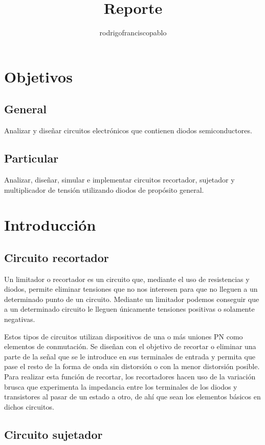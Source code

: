 \documentclass{mylib/reporteConCalif}
\title{Reporte}
\author{rodrigofranciscopablo }
\begin{document}
\coverPage

\section{Objetivos}

\subsection{General}

Analizar y diseñar circuitos electrónicos que contienen diodos semiconductores.

\subsection{Particular}

Analizar, diseñar, simular e implementar circuitos recortador, sujetador y multiplicador de tensión utilizando diodos
de propósito general.

\section{Introducción}

\subsection{Circuito recortador}

Un limitador o recortador es un circuito que, mediante el uso de resistencias y diodos, permite eliminar tensiones que no nos interesen para que no lleguen a un determinado punto de un circuito. Mediante un limitador podemos conseguir que a un determinado circuito le lleguen únicamente tensiones positivas o solamente negativas.

Estos tipos de circuitos utilizan dispositivos de una o más uniones PN como elementos de conmutación. Se diseñan con el objetivo de recortar o eliminar una parte de la señal que se le introduce en sus terminales de entrada y permita que pase el resto de la forma de onda sin distorsión o con la menor distorsión posible. Para realizar esta función de recortar, los recortadores hacen uso de la variación brusca que experimenta la impedancia entre los terminales de los diodos y transistores al pasar de un estado a otro, de ahí que sean los elementos básicos en dichos circuitos. 

	
\subsection{Circuito sujetador}
\end{document}
